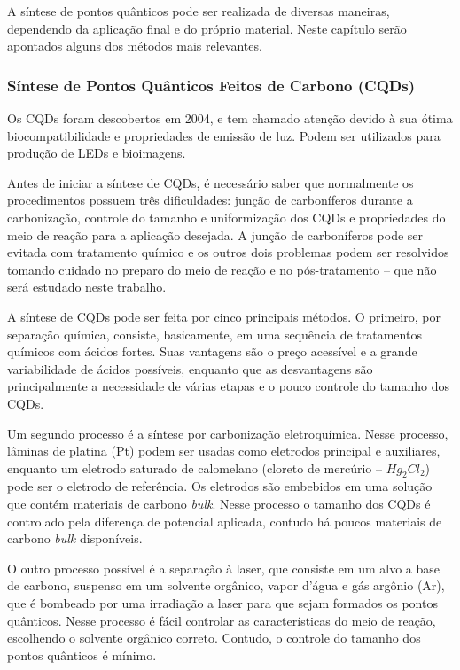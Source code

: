 A síntese de pontos quânticos pode ser realizada de diversas maneiras, dependendo da aplicação final e do próprio material. Neste capítulo serão apontados alguns dos métodos mais relevantes.

\subsubsection{Síntese de Pontos Quânticos Feitos de Carbono (CQDs)}

\par Os CQDs foram descobertos em 2004, e tem chamado atenção devido à sua ótima biocompatibilidade e propriedades de emissão de luz. Podem ser utilizados para produção de LEDs e bioimagens\cite{sintese1}.

\par Antes de iniciar a síntese de CQDs, é necessário saber que normalmente os procedimentos possuem três dificuldades\cite{sintese2}: junção de carboníferos durante a carbonização, controle do tamanho e uniformização dos CQDs e propriedades do meio de reação para a aplicação desejada. A junção de carboníferos pode ser evitada com tratamento químico e os outros dois problemas podem ser resolvidos tomando cuidado no preparo do meio de reação e no pós-tratamento – que não será estudado neste trabalho.

\par A síntese de CQDs pode ser feita por cinco principais métodos\cite{sintese2}. O primeiro, por separação química, consiste, basicamente, em uma sequência de tratamentos químicos com ácidos fortes. Suas vantagens são o preço acessível e a grande variabilidade de ácidos possíveis, enquanto que as desvantagens são principalmente a necessidade de várias etapas e o pouco controle do tamanho dos CQDs.

\par Um segundo processo é a síntese por carbonização eletroquímica. Nesse processo, lâminas de platina (Pt) podem ser usadas como eletrodos principal e auxiliares, enquanto um eletrodo saturado de calomelano (cloreto de mercúrio – $Hg_{2}Cl_{2}$) pode ser o eletrodo de referência. Os eletrodos são embebidos em uma solução que contém materiais de carbono \textit{bulk}. Nesse processo o tamanho dos CQDs é controlado pela diferença de potencial aplicada, contudo há poucos materiais de carbono \textit{bulk} disponíveis.

\par O outro processo possível é a separação à laser, que consiste em um alvo a base de carbono, suspenso em um solvente orgânico, vapor d’água e gás argônio (Ar), que é bombeado por uma irradiação a laser para que sejam formados os pontos quânticos. Nesse processo é fácil controlar as características do meio de reação, escolhendo o solvente orgânico correto. Contudo, o controle do tamanho dos pontos quânticos é mínimo.

